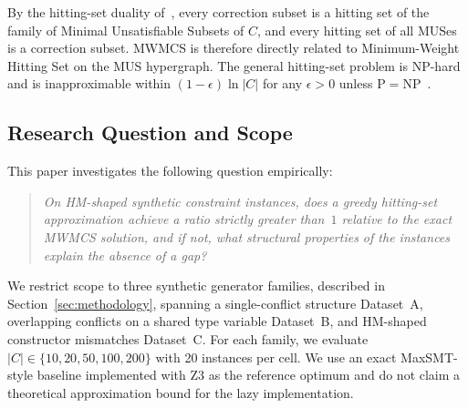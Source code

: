 By the hitting-set duality of~\cite{marques-silva2013}, every correction subset
is a hitting set of the family of Minimal Unsatisfiable Subsets of $C$, and
every hitting set of all MUSes is a correction subset.
MWMCS is therefore directly related to Minimum-Weight Hitting Set on the MUS
hypergraph.
The general hitting-set problem is NP-hard and is inapproximable within
$(1-\epsilon)\ln|C|$ for any $\epsilon > 0$ unless
$\mathrm{P} = \mathrm{NP}$~\cite{feige1998}.

\subsection{Research Question and Scope}

This paper investigates the following question empirically:

\begin{quote}
  \emph{On HM-shaped synthetic constraint instances, does a greedy
  hitting-set approximation achieve a ratio strictly greater than~$1$ relative
  to the exact MWMCS solution, and if not, what structural properties of the
  instances explain the absence of a gap?}
\end{quote}

We restrict scope to three synthetic generator families, described in
Section~\ref{sec:methodology}, spanning a single-conflict structure
Dataset~A, overlapping conflicts on a shared type variable Dataset~B, and
HM-shaped constructor mismatches Dataset~C.
For each family, we evaluate $|C| \in \{10, 20, 50, 100, 200\}$ with 20
instances per cell.
We use an exact MaxSMT-style baseline implemented with Z3 as the reference
optimum and do not claim a theoretical approximation bound for the lazy
implementation.
